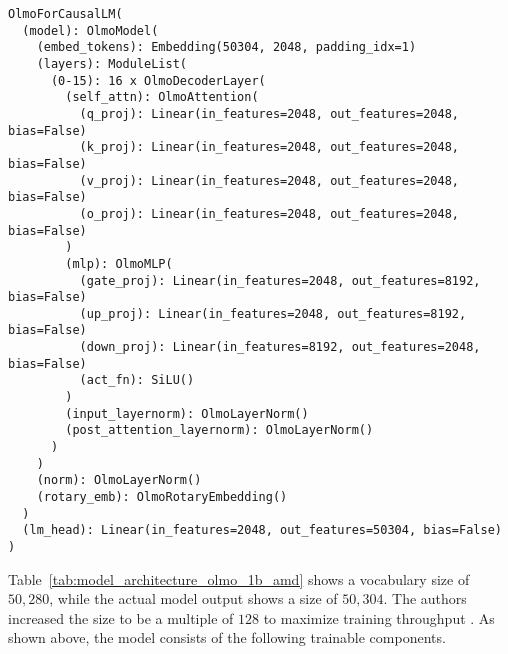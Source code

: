 \begin{verbatim}
OlmoForCausalLM(
  (model): OlmoModel(
    (embed_tokens): Embedding(50304, 2048, padding_idx=1)
    (layers): ModuleList(
      (0-15): 16 x OlmoDecoderLayer(
        (self_attn): OlmoAttention(
          (q_proj): Linear(in_features=2048, out_features=2048, bias=False)
          (k_proj): Linear(in_features=2048, out_features=2048, bias=False)
          (v_proj): Linear(in_features=2048, out_features=2048, bias=False)
          (o_proj): Linear(in_features=2048, out_features=2048, bias=False)
        )
        (mlp): OlmoMLP(
          (gate_proj): Linear(in_features=2048, out_features=8192, bias=False)
          (up_proj): Linear(in_features=2048, out_features=8192, bias=False)
          (down_proj): Linear(in_features=8192, out_features=2048, bias=False)
          (act_fn): SiLU()
        )
        (input_layernorm): OlmoLayerNorm()
        (post_attention_layernorm): OlmoLayerNorm()
      )
    )
    (norm): OlmoLayerNorm()
    (rotary_emb): OlmoRotaryEmbedding()
  )
  (lm_head): Linear(in_features=2048, out_features=50304, bias=False)
)
\end{verbatim}
Table~\ref{tab:model_architecture_olmo_1b_amd} shows a vocabulary size of $50{,}280$, while the actual model output shows a size of $50{,}304$. The authors increased the size to be a multiple of $128$ to maximize training throughput \cite{Groeneveld2023OLMo}. As shown above, the model consists of the following trainable components.
